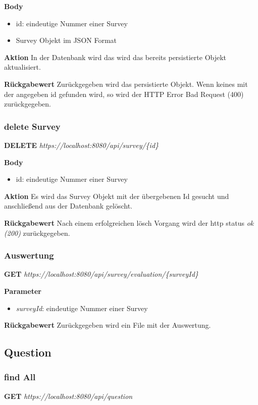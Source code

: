 \textbf{Body}
\begin{itemize}
    \item id: eindeutige Nummer einer Survey
    \item Survey Objekt im JSON Format
\end{itemize}

\textbf{Aktion}
In der Datenbank wird das wird das bereits persistierte Objekt aktualisiert.

\textbf{Rückgabewert}
Zurückgegeben wird das persistierte Objekt. Wenn keines mit der angegeben id gefunden wird, so wird der HTTP Error Bad Request
(400) zurückgegeben.

\subsubsection{delete Survey}
\textbf{DELETE} \emph{https://localhost:8080/api/survey/\{id\}}

\textbf{Body}
\begin{itemize}
    \item id: eindeutige Nummer einer Survey
\end{itemize}

\textbf{Aktion}
Es wird das Survey Objekt mit der übergebenen Id gesucht und anschließend
aus der Datenbank gelöscht.

\textbf{Rückgabewert}
Nach einem erfolgreichen lösch Vorgang wird der http status \emph{ok (200)} zurückgegeben.

\subsubsection{Auswertung}
\textbf{GET} \emph{https://localhost:8080/api/survey/evaluation/\{surveyId\}}

\textbf{Parameter}
\begin{itemize}
    \item \emph{surveyId}: eindeutige Nummer einer Survey
\end{itemize}

\textbf{Rückgabewert}
Zurückgegeben wird ein File mit der Auswertung.

\subsection{Question}
\subsubsection{find All}
\textbf{GET} \emph{https://localhost:8080/api/question}

